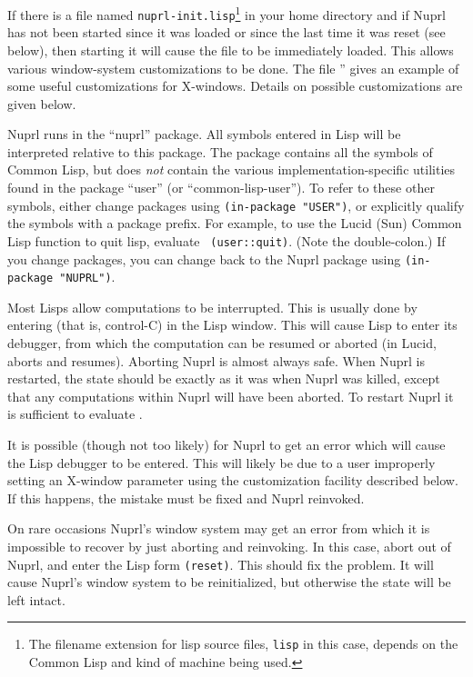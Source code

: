 If there is a file named {\tt nuprl-init.lisp}\footnote{The filename
extension for lisp source files, {\tt lisp} in this case, depends on the
Common Lisp and kind of machine being used.} in your home directory and if
Nuprl has not been started since it was loaded or since the last time it
was reset (see below), then starting it will cause the file to be
immediately loaded.  This allows various window-system customizations to be
done.  The file '' gives an example of some
useful customizations for X-windows.  Details on possible customizations
are given below.

Nuprl runs in the ``nuprl'' package.  All symbols entered in Lisp will
be interpreted relative to this package.  The package contains all the
symbols of Common Lisp, but does {\em not} contain the various
implementation-specific utilities found in the package ``user'' (or
``common-lisp-user'').  To refer to these other symbols, either change
packages using {\tt (in-package "USER")}, or explicitly qualify the
symbols with a package prefix.  For example, to use the Lucid (Sun)
Common Lisp function  to quit lisp, evaluate {\tt
(user::quit)}.  (Note the double-colon.)  If you change packages, you
can change back to the Nuprl package using {\tt (in-package "NUPRL")}.


Most Lisps allow computations to be interrupted.  This is usually done by
entering  (that is, control-C) in the Lisp window.  This will cause
Lisp to enter its debugger, from which the computation can be resumed or
aborted (in Lucid,  aborts and  resumes).  Aborting Nuprl
is almost always safe.  When Nuprl is restarted, the state should be
exactly as it was when Nuprl was killed, except that any computations
within Nuprl will have been aborted.  To restart Nuprl it is sufficient to 
evaluate .

It is possible (though not too likely) for Nuprl to get an error which
will cause the Lisp debugger to be entered.  This will likely be due
to a user improperly setting an X-window parameter using the
customization facility described below.  If this happens, the mistake
must be fixed and Nuprl reinvoked.

On rare occasions Nuprl's window system may get an error from which it is
impossible to recover by just aborting and reinvoking.  In this case, abort
out of Nuprl, and enter the Lisp form {\tt (reset)}.  This should fix the
problem.  It will cause Nuprl's window system to be reinitialized, but
otherwise the state will be left intact.

